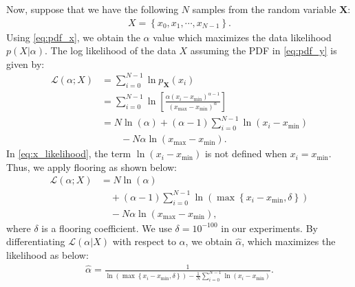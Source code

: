 \documentclass[a4paper]{article}
\begin{document}
Now, suppose that we have the following $N$ samples from 
the random variable $\mathbf{X}$:
\begin{align}
  X = \left\{x_0, x_1, \cdots, x_{N-1}\right\}.
    \label{eq:x_samples}
\end{align}
Using \eqref{eq:pdf_x}, we obtain the $\alpha$ value which maximizes 
the data likelihood $p(X|\alpha)$.
The log likelihood of the data $X$ assuming the PDF in \eqref{eq:pdf_y}
is given by:
%
\begin{align}
  \mathcal{L}\left(\alpha ; X\right) 
      & = \sum_{i=0}^{N-1} \ln p_{\mathbf{X}} \left( x_i \right)  \nonumber \\
      & = \sum_{i=0}^{N-1} 
              \ln \left[ \frac{ \alpha (x_i - x_{\text{min}} )^{\alpha-1}}  
              {\left(x_{\text{max}} - x_{\text{min}} \right)^{\alpha}} \right]  \nonumber \\
      & = N \ln(\alpha) + \left(\alpha-1 \right) \sum_{i=0}^{N-1}
        \ln \left(x_i - x_{\text{min}} \right)  \nonumber \\
      & \qquad - N \alpha \ln \left(x_{\text{max}} - x_{\text{min}} \right).
        \label{eq:x_likelihood}
\end{align}
%
In \eqref{eq:x_likelihood}, the term $\ln \left(x_i - x_{\text{min}}
\right)$ is not defined when $x_i = x_{\text{min}}$. Thus, we apply flooring as
shown below:
\begin{align}
  \mathcal{L}\left(\alpha ; X\right) & =  
    N \ln(\alpha) \nonumber \\
     & \quad  + \left(\alpha-1 \right) \sum_{i=0}^{N-1}
        \ln \left(\max \left\{x_i - x_{\text{min}}, \delta \right\} \right)
          \nonumber \\
      & \quad - N \alpha \ln \left(x_{\text{max}} - x_{\text{min}} \right),
        \label{eq:x_likelihood}
\end{align}
where $\delta$ is a flooring coefficient. We use $\delta = 10^{-100}$ in our
experiments.
%
By differentiating $\mathcal{L}\left(\alpha | X\right)$ with respect to 
$\alpha$, we obtain $\hat{\alpha}$, which maximizes the likelihood as below:
\begin{align}
  \hat{\alpha} = \frac{1}{
    \ln \left(\max \left\{x_i - x_{\text{min}}, \delta \right\} \right)
    - \frac{1}{N} \sum_{i=0}^{N-1} \ln \left(x_i - x_{\text{min}}\right)}.
  \label{eq:alpha_estimation}
\end{align}
%
%
\end{document}
